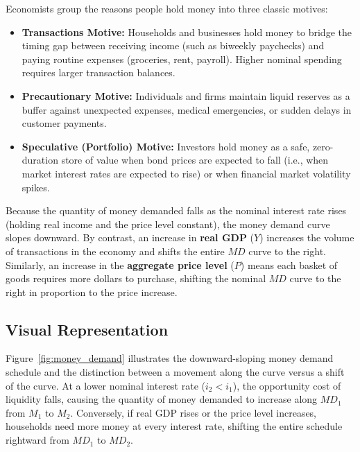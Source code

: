 \documentclass[11pt, a4paper]{article}
\begin{document}
Economists group the reasons people hold money into three classic motives:
\begin{itemize}[leftmargin=1.4em, itemsep=0.25em]
  \item \textbf{Transactions Motive:} Households and businesses hold money to bridge the timing gap between receiving income (such as biweekly paychecks) and paying routine expenses (groceries, rent, payroll). Higher nominal spending requires larger transaction balances.
  \item \textbf{Precautionary Motive:} Individuals and firms maintain liquid reserves as a buffer against unexpected expenses, medical emergencies, or sudden delays in customer payments.
  \item \textbf{Speculative (Portfolio) Motive:} Investors hold money as a safe, zero-duration store of value when bond prices are expected to fall (i.e., when market interest rates are expected to rise) or when financial market volatility spikes.
\end{itemize}

Because the quantity of money demanded falls as the nominal interest rate rises (holding real income and the price level constant), the money demand curve slopes downward. By contrast, an increase in \textbf{real GDP} ($Y$) increases the volume of transactions in the economy and shifts the entire $MD$ curve to the right. Similarly, an increase in the \textbf{aggregate price level} ($P$) means each basket of goods requires more dollars to purchase, shifting the nominal $MD$ curve to the right in proportion to the price increase.

\subsection*{Visual Representation}
Figure~\ref{fig:money_demand} illustrates the downward-sloping money demand schedule and the distinction between a movement along the curve versus a shift of the curve. At a lower nominal interest rate ($i_2 < i_1$), the opportunity cost of liquidity falls, causing the quantity of money demanded to increase along $MD_1$ from $M_1$ to $M_2$. Conversely, if real GDP rises or the price level increases, households need more money at every interest rate, shifting the entire schedule rightward from $MD_1$ to $MD_2$.
\end{document}
